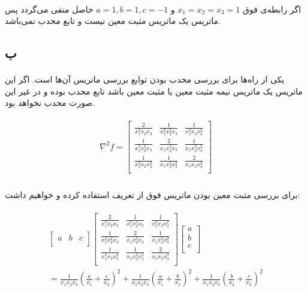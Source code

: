 \documentclass[paper=a4, fontsize=11pt]{article}
\numberwithin{equation}{section} %
\numberwithin{figure}{section} %
\numberwithin{table}{section} %
\begin{document}
\paragraph{}
اگر رابطه‌ی فوق
\(x_1=x_2=x_3=1\)
و
\(a=1, b=1, c=-1\)
حاصل منفی می‌گردد پس ماتریس 
یک ماتریس مثبت معین نیست و تابع محدب نمی‌باشد.

\subsection{ب}
\paragraph{}
یکی از راه‌ها برای بررسی محدب بودن توابع بررسی ماتریس  آن‌ها است.
اگر این ماتریس یک ماتریس نیمه مثبت معین یا مثبت معین باشد تابع محدب بوده و در غیر این صورت محدب نخواهد بود.

\begin{align}
\begin{split}
	\nabla^2f = \left[\begin{array}{ccc}
		\frac{2}{x_1^3x_2x_3} & \frac{1}{x_1^2x_2^2x_3} & \frac{1}{x_1^2x_2x_3^2} \\
		\frac{1}{x_1^2x_2^2x_3} & \frac{2}{x_1x_2^3x_3} & \frac{1}{x_1x_2^2x_3^2} \\
		\frac{1}{x_1^2x_2x_3^2} & \frac{1}{x_1x_2^2x_3^2} & \frac{2}{x_1x_2x_3^3} \\
	\end{array}\right]
\end{split}
\end{align}

\paragraph{}
برای بررسی مثبت معین بودن ماتریس فوق از تعریف استفاده کرده و خواهیم داشت:

\begin{align}
\begin{split}
	\left[\begin{array}{ccc}
		a & b & c \\
	\end{array}\right]
	\left[\begin{array}{ccc}
		\frac{2}{x_1^3x_2x_3} & \frac{1}{x_1^2x_2^2x_3} & \frac{1}{x_1^2x_2x_3^2} \\
		\frac{1}{x_1^2x_2^2x_3} & \frac{2}{x_1x_2^3x_3} & \frac{1}{x_1x_2^2x_3^2} \\
		\frac{1}{x_1^2x_2x_3^2} & \frac{1}{x_1x_2^2x_3^2} & \frac{2}{x_1x_2x_3^3} \\
	\end{array}\right]
	\left[\begin{array}{c}
		a \\
		b \\
		c \\
	\end{array}\right]
	\\
	= \frac{1}{x_1x_2x_3}(\frac{a}{x_1} + \frac{c}{x_3})^2
	+  \frac{1}{x_1x_2x_3}(\frac{a}{x_1} + \frac{b}{x_2})^2
	+  \frac{1}{x_1x_2x_3}(\frac{b}{x_2} + \frac{c}{x_3})^2
\end{split}
\end{align}
\end{document}
